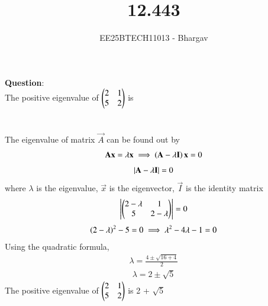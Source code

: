 \documentclass[journal]{IEEEtran}
\begin{document}

\vspace{3cm}

\title{12.443}
\author{EE25BTECH11013 - Bhargav}
\maketitle
    {\let\newpage\relax\maketitle}

\renewcommand{\thefigure}{\theenumi}
\renewcommand{\thetable}{\theenumi}
\setlength{\intextsep}{10pt} %

\renewcommand{\thetable}{\theenumi}

\textbf{Question}: \\
The positive eigenvalue of $\begin{pmatrix}2 & 1 \\ 5 & 2\end{pmatrix}$
is \\ \\
\solution \\
The eigenvalue of matrix $\vec{A}$ can be found out by 
\begin{align}
\mathbf{A}\mathbf{x} = \lambda \mathbf{x} \implies \left(\mathbf{A}-\lambda\mathbf{I}\right)\mathbf{x} = 0
\end{align}
\begin{align}
\left\vert\mathbf{A} - \lambda\mathbf{I}\right\vert = 0    
\end{align}
 where $\lambda$ is the eigenvalue, $\vec{x}$ is the eigenvector, $\vec{I}$ is the identity matrix
\begin{align}
\left\vert\begin{pmatrix}2-\lambda & 1 \\ 5 & 2-\lambda\end{pmatrix}\right\vert = 0 
\end{align}
\begin{align}
\left(2-\lambda\right)^2 - 5 = 0 \implies \lambda^2 - 4\lambda - 1 = 0
\end{align}
Using the quadratic formula, 
\begin{align}
\lambda = \frac{4 \pm \sqrt{16 + 4}}{2}
\end{align}
\begin{align}
\lambda = 2 \pm \sqrt{5}
\end{align}
The positive eigenvalue of $\begin{pmatrix}2 & 1 \\ 5 & 2\end{pmatrix}$ is 2 + $\sqrt{5}$
\end{document}
